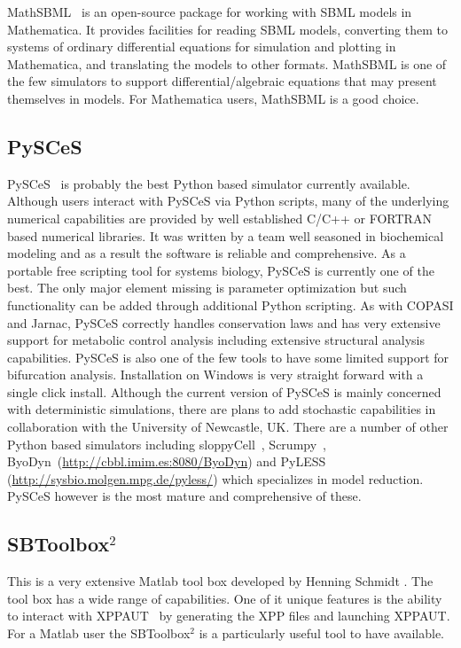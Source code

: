 \documentclass[12pt]{article}
\begin{document}
MathSBML~\citep{Shapiro:2004} is an open-source package for working with SBML models in Mathematica. It provides facilities for reading SBML models, converting them to systems of ordinary differential equations for simulation and plotting in Mathematica, and translating the models to other formats. MathSBML is one of the few simulators to support differential/algebraic equations that may present themselves in models. For Mathematica users, MathSBML is a good choice.

\subsection{PySCeS}

PySCeS~\citep{Pysces2005} is probably the best Python based simulator
currently available. Although users interact with PySCeS via Python
scripts, many of the underlying numerical capabilities are provided
by well established C/C++ or FORTRAN based numerical libraries. It
was written by a team well seasoned in biochemical modeling and as a
result the software is reliable and comprehensive. As a portable
free scripting tool for systems biology, PySCeS is currently one of
the best. The only major element missing is parameter optimization
but such functionality can be added through additional Python
scripting. As with COPASI and Jarnac, PySCeS correctly handles
conservation laws and has very extensive support for metabolic
control analysis including extensive structural analysis
capabilities. PySCeS is also one of the few tools to have some
limited support for bifurcation analysis. Installation on Windows is
very straight forward with a single click install. Although the
current version of PySCeS is mainly concerned with deterministic
simulations, there are plans to add stochastic capabilities in
collaboration with the University of Newcastle, UK. There are a
number of other Python based simulators including
sloppyCell~\citep{SloppyCell:2007}, Scrumpy~\citep{Poolman:2006}, ByoDyn~(\url{http://cbbl.imim.es:8080/ByoDyn}) and PyLESS (\url{http://sysbio.molgen.mpg.de/pyless/}) which specializes
in model reduction. PySCeS however is the most mature and comprehensive of these.

\subsection{SBToolbox$^2$}

This is a very extensive Matlab tool box developed by Henning
Schmidt \citep{Henning:2006}. The tool box has a wide range of
capabilities. One of it unique features is the ability to interact
with XPPAUT~\citep{XPPAUT:2002} by generating the XPP files and
launching XPPAUT. For a Matlab user the SBToolbox$^2$ is a
particularly useful tool to have available.
\end{document}
